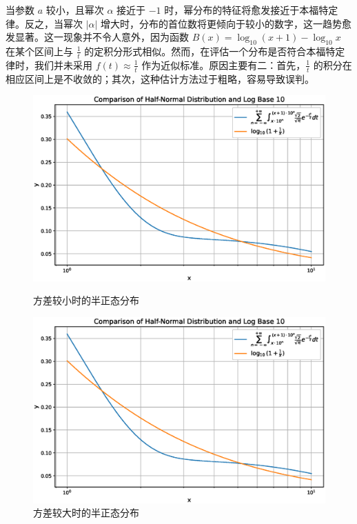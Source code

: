 \documentclass{ctexart} %
\begin{document}
当参数 $ a $ 较小，且幂次 $ \alpha $ 接近于 $ -1 $ 时，幂分布的特征将愈发接近于本福特定律。反之，当幂次 $ |\alpha| $ 增大时，分布的首位数将更倾向于较小的数字，这一趋势愈发显著。这一现象并不令人意外，因为函数 $ B(x) = \log_{10}(x+1) - \log_{10}x $ 在某个区间上与 $ \frac{1}{t} $ 的定积分形式相似。然而，在评估一个分布是否符合本福特定律时，我们并未采用 $ f(t) \approx \frac{1}{t} $ 作为近似标准。原因主要有二：首先，$ \frac{1}{t} $ 的积分在相应区间上是不收敛的；其次，这种估计方法过于粗略，容易导致误判。

\begin{figure}[H]
    \begin{minipage}{0.48\textwidth}
        \includegraphics[width=\textwidth]{norm1.eps}
        \caption{方差较小时的半正态分布}
    \end{minipage}
    \hfill
    \begin{minipage}{0.48\textwidth}
        \includegraphics[width=\textwidth]{norm2.eps}
        \caption{方差较大时的半正态分布}
    \end{minipage}
\end{figure}
\end{document}
